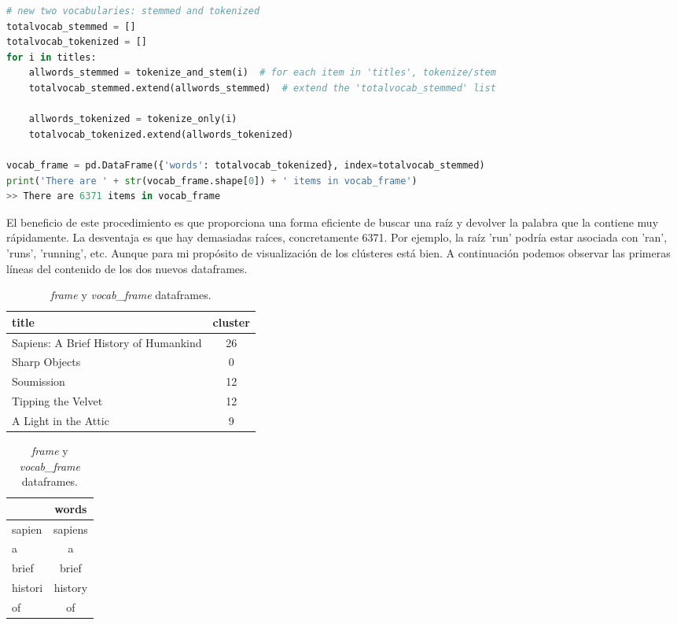 \documentclass{uimppracticas}
\begin{document}
\newpage
\begin{lstlisting}[language=python]
# new two vocabularies: stemmed and tokenized
totalvocab_stemmed = []
totalvocab_tokenized = []
for i in titles:
	allwords_stemmed = tokenize_and_stem(i)  # for each item in 'titles', tokenize/stem
	totalvocab_stemmed.extend(allwords_stemmed)  # extend the 'totalvocab_stemmed' list

	allwords_tokenized = tokenize_only(i)
	totalvocab_tokenized.extend(allwords_tokenized)
	
vocab_frame = pd.DataFrame({'words': totalvocab_tokenized}, index=totalvocab_stemmed)
print('There are ' + str(vocab_frame.shape[0]) + ' items in vocab_frame')
>> There are 6371 items in vocab_frame
\end{lstlisting}

El beneficio de este procedimiento es que proporciona una forma eficiente de buscar una raíz y devolver la palabra que la contiene muy rápidamente. La desventaja es que hay demasiadas raíces, concretamente 6371. Por ejemplo, la raíz 'run' podría estar asociada con 'ran', 'runs', 'running', etc. Aunque para mi propósito de visualización de los clústeres está bien. A continuación podemos observar las primeras líneas del contenido de los dos nuevos dataframes.

\begin{table}[!htb]
	\centering
	\caption{\textit{frame} y \textit{vocab\_frame} dataframes.}
	\begin{minipage}{.6\linewidth}
		\centering
		\begin{tabular}{lc}
			\toprule
			title &  cluster \\
			\midrule
			Sapiens: A Brief History of Humankind & 26 \\
			Sharp Objects & 0 \\
			Soumission & 12 \\
			Tipping the Velvet & 12 \\
			A Light in the Attic & 9 \\
			\bottomrule
		\end{tabular}
	\end{minipage}%
	\begin{minipage}{.4\linewidth}
		\centering
		\begin{tabular}{lc}
			\toprule
			& words \\
			\midrule
			sapien & sapiens \\
			a & a \\
			brief & brief \\
			histori & history \\
			of & of \\
			\bottomrule
		\end{tabular}
	\end{minipage} 
\end{table}
\end{document}
